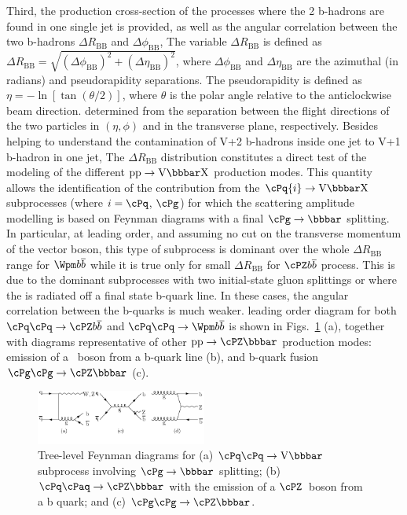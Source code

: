 {Third, the production cross-section of the processes where the 2 b-hadrons are found in one single jet is provided, as well as the angular correlation between the two b-hadrons $\Delta R_{\mathrm{BB}}$ and $\Delta\phi_{\mathrm{BB}}$, The variable $\Delta R_{\mathrm{BB}}$ is defined as $\Delta R_{\mathrm{BB}} = \sqrt{ (\Delta \phi_{\mathrm{BB}})^2 + (\Delta \eta_{\mathrm{BB}})^2}$, where $\Delta \phi_{\mathrm{BB}}$ and $\Delta \eta_{\mathrm{BB}}$ are the azimuthal (in radians) and pseudorapidity separations. The pseudorapidity is defined as $\eta= -\ln[\tan(\theta/2)]$, where $\theta$ is the polar angle  relative to the anticlockwise beam direction. determined from the separation between the flight directions of the two particles in $(\eta,\phi)$ and in the transverse plane, respectively.  Besides helping to understand the contamination of V+2 b-hadrons inside one jet to V+1 b-hadron in one jet, The $\Delta R_{\mathrm{BB}}$
distribution constitutes a direct test of the modeling of the different $\mathrm{pp}\rightarrow {\rm V} \bbbar\mathrm{X}$ production modes. This quantity allows the identification of the contribution from the $\cPq{i} \rightarrow {\rm V} \bbbar \mathrm{X}$ subprocesses (where $i=\cPq$, $\cPg$) for which the scattering amplitude modelling is based on Feynman diagrams with a final $\cPg \rightarrow \bbbar$ splitting. In particular, at leading order, and assuming no cut on the transverse momentum of the vector boson, this type of subprocess is dominant over the whole  $\Delta R_{\mathrm{BB}}$ range for $\Wpm b\overline{b}$ while it is true only for small $\Delta R_{\mathrm{BB}}$ for $\cPZ b\overline{b}$ process. This is due to the dominant subprocesses with two initial-state gluon splittings or where the \cPZ is radiated off a final state b-quark line. In these cases, the angular correlation between the b-quarks is much weaker. leading order diagram for both $\cPq\cPq\rightarrow \cPZ b\overline{b}$ and  $\cPq\cPq\rightarrow \Wpm b\overline{b}$ is shown in Figs.~\ref{diag} (a), together with diagrams representative of other $\mathrm{pp}\rightarrow\cPZ\bbbar$ production modes: emission of a \cPZ~boson from a b-quark
line (b), and b-quark fusion $\cPg\cPg \rightarrow \cPZ\bbbar$ (c).

\begin{figure}[!t]
	\begin{center}
	\includegraphics[width=0.5\textwidth]{figures_for_paper/croppedWZbb.pdf}
	\caption{Tree-level Feynman diagrams for (a) $\cPq\cPq
          \rightarrow {\rm V}\bbbar$ subprocess
          involving $\cPg\rightarrow \bbbar$
          splitting; (b)  $\cPq\cPaq \rightarrow \cPZ\bbbar$ with the
          emission of a $ \cPZ$~boson from a b quark; and (c) $\cPg\cPg \rightarrow \cPZ\bbbar$.}
\label{diag}	
	\end{center}
\end{figure}

}
